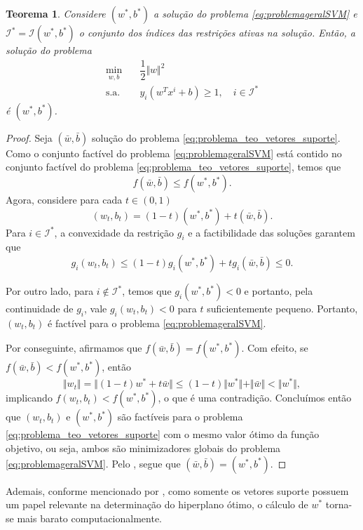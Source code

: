\documentclass[12pt,a4paper]{scrartcl}
\newtheorem{teo}{Teorema}
\theoremstyle{definition}%
\begin{document}
\begin{teo} \label{teo:vetores_suporte}
Considere $(w^{*}, b^{*})$ a solução do problema \eqref{eq:problemageralSVM} e $\mathcal{I}^{*} = \mathcal{I} (w^{*}, b^{*})$ o conjunto dos índices das restrições ativas na solução. Então, a solução do problema
\[ \label{eq:problema_teo_vetores_suporte}
\begin{aligned}
\min_{w,b} & \quad \dfrac{1}{2} \Vert w\Vert^{2} \\
\text{s.a.} &  \quad y_i(w^{T}x^{i}+b) \geq 1, \quad i \in \mathcal{I}^{*}
\end{aligned}
\]
é $(w^{*}, b^{*})$.
\end{teo}
\begin{proof}
Seja $(\bar{w}, \bar{b} )$ solução do problema \eqref{eq:problema_teo_vetores_suporte}. Como o conjunto factível do problema \eqref{eq:problemageralSVM} está contido no conjunto factível do problema \eqref{eq:problema_teo_vetores_suporte}, temos que
\[
f(\bar{w}, \bar{b} ) \leq f(w^{*}, b^{*} ).
\]
Agora, considere para cada $t\in (0,1)$ 
\[
(w_{t}, b_{t}) = (1-t)(w^{*}, b^{*}) + t(\bar{w}, \bar{b}) .
\]
Para $i\in \mathcal{I}^{*}$, a convexidade da restrição $g_{i}$ e a factibilidade das soluções garantem que 
\[
g_{i} (w_{t}, b_{t}) \leq (1-t)g_{i} (w^{*}, b^{*}) + tg_{i} (\bar{w}, \bar{b}) \leq 0.
\]

Por outro lado, para $i\notin \mathcal{I}^{*}$, temos que $g_{i}(w^{*}, b^{*}) <0$ e portanto, pela continuidade de $g_{i}$, vale $g_{i} (w_{t}, b_{t}) <0$ para $t$ suficientemente pequeno. Portanto, $(w_{t}, b_{t})$ é factível para o problema \eqref{eq:problemageralSVM}.

Por conseguinte, afirmamos que $f(\bar{w}, \bar{b}) = f(w^{*}, b^{*})$. Com efeito, se $f(\bar{w}, \bar{b}) < f(w^{*}, b^{*})$, então
\[
\Vert w_{t} \Vert  = \Vert (1-t) w^{*} + t\bar{w} \Vert \leq (1-t) \Vert w^{*} \Vert + \Vert \bar{w} \Vert < \Vert w^{*} \Vert ,
\]
implicando $f(w_{t}, b_{t}) < f(w^{*}, b^{*})$, o que é uma contradição. 
Concluímos então que $(w_{t}, b_{t})$ e $(w^{*}, b^{*})$ são factíveis para o problema \eqref{eq:problema_teo_vetores_suporte} com o mesmo valor ótimo da função objetivo, ou seja, ambos são minimizadores globais do problema \eqref{eq:problemageralSVM}. Pelo , segue que $(\bar{w}, \bar{b}) = (w^{*}, b^{*})$.
\end{proof}

Ademais, conforme mencionado por \textcite{Evelin2017}, como somente os vetores suporte possuem um papel relevante na determinação do hiperplano ótimo, o cálculo de $w^{*}$ torna-se mais barato computacionalmente.
\end{document}
